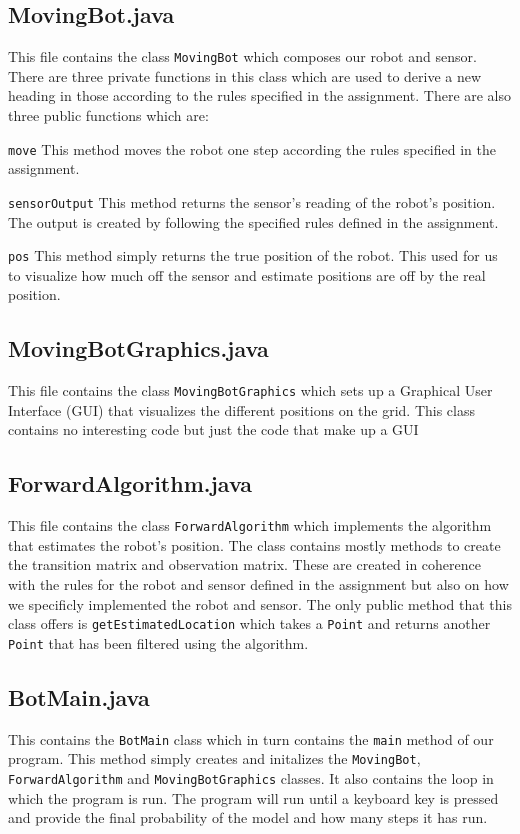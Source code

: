 \documentclass[a4paper]{article}
\begin{document}
\subsection{MovingBot.java}
This file contains the class \texttt{MovingBot} which composes our robot and sensor. There are three private functions in this class which are used to derive a new heading in those according to the rules specified in the assignment. There are also three public functions which are:
\begin{description}
\item{\texttt{move}} This method moves the robot one step according the rules specified in the assignment.
\item{\texttt{sensorOutput}} This method returns the sensor's reading of the robot's position. The output is created by following the specified rules defined in the assignment.
\item{\texttt{pos}} This method simply returns the true position of the robot. This used for us to visualize how much off the sensor and estimate positions are off by the real position.
\end{description}

\subsection{MovingBotGraphics.java}
This file contains the class \texttt{MovingBotGraphics} which sets up a Graphical User Interface (GUI) that visualizes the different positions on the grid. This class contains no interesting code but just the code that make up a GUI
\subsection{ForwardAlgorithm.java} This file contains the class \texttt{ForwardAlgorithm} which implements the algorithm that estimates the robot's position. The class contains mostly methods to create the transition matrix and observation matrix. These are created in coherence with the rules for the robot and sensor defined in the assignment but also on how we specificly implemented the robot and sensor. The only public method that this class offers is \texttt{getEstimatedLocation} which takes a \texttt{Point} and returns another \texttt{Point} that has been filtered using the algorithm.
\subsection{BotMain.java} This contains the \texttt{BotMain} class which in turn contains the \texttt{main} method of our program. This method simply creates and initalizes the \texttt{MovingBot}, \texttt{ForwardAlgorithm} and \texttt{MovingBotGraphics} classes. It also contains the loop in which the program is run. The program will run until a keyboard key is pressed and provide the final probability of the model and how many steps it has run.
\end{document}
